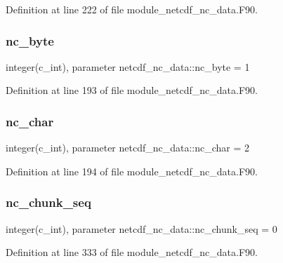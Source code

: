Definition at line 222 of file module\+\_\+netcdf\+\_\+nc\+\_\+data.\+F90.

\mbox{\label{namespacenetcdf__nc__data_a17953f2b51e4acea33c2df068cba45c6}} 
\subsubsection{\texorpdfstring{nc\+\_\+byte}{nc\_byte}}
{\footnotesize\ttfamily integer(c\+\_\+int), parameter netcdf\+\_\+nc\+\_\+data\+::nc\+\_\+byte = 1}



Definition at line 193 of file module\+\_\+netcdf\+\_\+nc\+\_\+data.\+F90.

\mbox{\label{namespacenetcdf__nc__data_a36ff919052313a4a3bd95596c4795a84}} 
\subsubsection{\texorpdfstring{nc\+\_\+char}{nc\_char}}
{\footnotesize\ttfamily integer(c\+\_\+int), parameter netcdf\+\_\+nc\+\_\+data\+::nc\+\_\+char = 2}



Definition at line 194 of file module\+\_\+netcdf\+\_\+nc\+\_\+data.\+F90.

\mbox{\label{namespacenetcdf__nc__data_a670a88cd85c6946569dcdb77944759f2}} 
\subsubsection{\texorpdfstring{nc\+\_\+chunk\+\_\+seq}{nc\_chunk\_seq}}
{\footnotesize\ttfamily integer(c\+\_\+int), parameter netcdf\+\_\+nc\+\_\+data\+::nc\+\_\+chunk\+\_\+seq = 0}



Definition at line 333 of file module\+\_\+netcdf\+\_\+nc\+\_\+data.\+F90.

